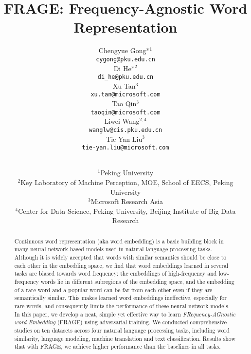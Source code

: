 \documentclass{article}
\begin{document}
\title{FRAGE: Frequency-Agnostic Word Representation}
\author{
  Chengyue Gong*$^{1}$\\
  \texttt{cygong@pku.edu.cn}\\
  \And
  Di He*$^{2}$\\
  \texttt{di\_he@pku.edu.cn} \\
  \And
  Xu Tan$^{3}$\\
  \texttt{xu.tan@microsoft.com} \\
  \And
  Tao Qin$^{3}$\\
  \texttt{taoqin@microsoft.com} \\
  \And
  Liwei Wang$^{2,4}$\\
  \texttt{wanglw@cis.pku.edu.cn} \\
  \And
  Tie-Yan Liu$^{3}$\\
  \texttt{tie-yan.liu@microsoft.com} \\
  \and
  \\
  $^1$Peking University\\
$^2$Key Laboratory of Machine Perception, MOE, School of EECS, Peking University\\
  $^3$Microsoft Research Asia\\
  $^4$Center for Data Science, Peking University, Beijing Institute of Big Data Research
}
\maketitle
\begin{abstract}
Continuous word representation (aka word embedding) is a basic building block in many neural network-based models used in natural language processing tasks. Although it is widely accepted that words with similar semantics should be close to each other in the embedding space, we find that word embeddings learned in several tasks are biased towards word frequency: the embeddings of high-frequency and low-frequency words lie in different subregions of the embedding space, and the embedding of a rare word and a popular word can be far from each other even if they are semantically similar. This makes learned word embeddings ineffective, especially for rare words, and consequently limits the performance of these neural network models. In this paper, we develop a neat, simple yet effective way to learn \emph{FRequency-AGnostic word Embedding} (FRAGE) using adversarial training. We conducted comprehensive studies on ten datasets across four natural language processing tasks, including word similarity, language modeling, machine translation and text classification. Results show that with FRAGE, we achieve higher performance than the baselines in all tasks.
\end{abstract}
\end{document}
